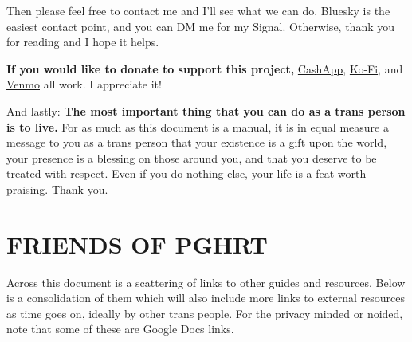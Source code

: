\documentclass{article}
\begin{document}
Then please feel free to contact me and I’ll see what we can do. Bluesky is the easiest contact point, and you can DM me for my Signal. Otherwise, thank you for reading and I hope it helps.

\textbf{If you would like to donate to support this project,} \href{https://cash.app/Katitties}{CashApp}, \href{https://ko-fi.com/katitties}{Ko-Fi}, and \href{https://account.venmo.com/u/katitties}{Venmo} all work. I appreciate it!

And lastly: \textbf{The most important thing that you can do as a trans person is to live.} For as much as this document is a manual, it is in equal measure a message to you as a trans person that your existence is a gift upon the world, your presence is a blessing on those around you, and that you deserve to be treated with respect. Even if you do nothing else, your life is a feat worth praising. Thank you.



\section*{FRIENDS OF PGHRT}\label{FOPGHRT}

Across this document is a scattering of links to other guides and resources. Below is a consolidation of them which will also include more links to external resources as time goes on, ideally by other trans people. For the privacy minded or noided, note that some of these are Google Docs links.
\end{document}
